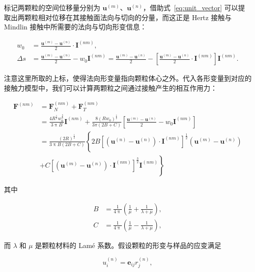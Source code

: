 标记两颗粒的空间位移量分别为 $\mathbf{u}^{(m)}$、$\mathbf{u}^{(n)}$，借助式~\eqref{eq:unit_vector} 可以提取出两颗粒相对位移在其接触面法向与切向的分量，而这正是 Hertz 接触与 Mindlin 接触中所需要的法向与切向形变信息：

\begin{align}
  w_{0} &= \frac{\mathbf{u}^{(m)} - \mathbf{u}^{(n)}}{2}\cdot \mathbf{I}^{(nm)},\\
  \Delta s &= \frac{\mathbf{u}^{(m)} - \mathbf{u}^{(n)}}{2} - w_{0}\mathbf{I}^{(nm)} = \frac{\mathbf{u}^{(m)} - \mathbf{u}^{(n)}}{2} - \left[\frac{\mathbf{u}^{(m)} - \mathbf{u}^{(n)}}{2}\cdot \mathbf{I}^{(nm)}\right]\mathbf{I}^{(nm)}.
\end{align}

注意这里所取的上标，使得法向形变量指向颗粒体心之外。代入各形变量到对应的接触力模型中，我们可以计算两颗粒之间通过接触产生的相互作用力：

\begin{equation}
  \begin{aligned}
  \mathbf{F}^{(nm)} &= \mathbf{F}_{N}^{(nm)} + \mathbf{F}_{T}^{(nm)}\\
  &= \frac{4R^{\frac{1}{2}}w_{0}^{\frac{3}{2}}}{3\uppi B}\mathbf{I}^{(nm)} + \frac{8(Rw_{0})^{\frac{1}{2}}}{3\pi(2B+C)}\left[\frac{\mathbf{u}^{(m)} - \mathbf{u}^{(n)}}{2} - w_{0}\mathbf{I}^{(nm)}\right]\\
  &= \frac{(2R)^{\frac{1}{2}}}{3\uppi B(2B+C)}\left\{2B\left[\left(\mathbf{u}^{(n)} - \mathbf{u}^{(n)}\right)\cdot \mathbf{I}^{(nm)}\right]^{\frac{1}{2}}\left(\mathbf{u}^{(m)} - \mathbf{u}^{(n)}\right)\right.\\
   &+ \left.C\left[\left(\mathbf{u}^{(m)} - \mathbf{u}^{(n)}\right)\cdot \mathbf{I}^{(nm)}\right]^{\frac{3}{2}}\mathbf{I}^{(nm)}\right\}
  \end{aligned}\label{eq:contact_force}
\end{equation}

其中

\begin{align}
  B &= \frac{1}{4\uppi}\left(\frac{1}{\mu} + \frac{1}{\lambda + \mu}\right),\\
  C &= \frac{1}{4\uppi}\left(\frac{1}{\mu} - \frac{1}{\lambda + \mu}\right),
\end{align}

而 $\lambda$ 和 $\mu$ 是颗粒材料的 Lamé 系数。假设颗粒的形变与样品的应变满足

\begin{equation}
  {u}_{i}^{(n)} = \mathbf{e}_{ij}{r}_{j}^{(n)}\label{eq:strain_displacement},
\end{equation}

